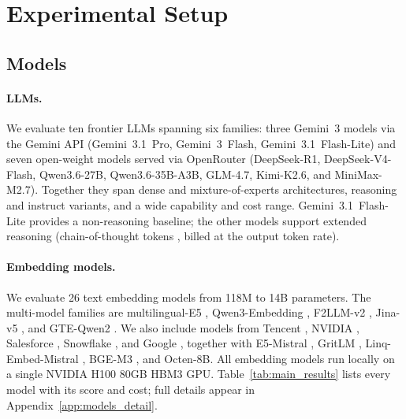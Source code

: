 \section{Experimental Setup}
\label{sec:setup}

\subsection{Models}

\paragraph{LLMs.}
We evaluate ten frontier LLMs spanning six families: three Gemini~3 models via the Gemini API (Gemini~3.1~Pro, Gemini~3~Flash, Gemini~3.1~Flash-Lite) and seven open-weight models served via OpenRouter (DeepSeek-R1, DeepSeek-V4-Flash, Qwen3.6-27B, Qwen3.6-35B-A3B, GLM-4.7, Kimi-K2.6, and MiniMax-M2.7).
Together they span dense and mixture-of-experts architectures, reasoning and instruct variants, and a wide capability and cost range.
Gemini~3.1~Flash-Lite provides a non-reasoning baseline; the other models support extended reasoning (chain-of-thought tokens \citep{wei2022cot}, billed at the output token rate).

\paragraph{Embedding models.}
We evaluate 26 text embedding models from 118M to 14B parameters. The multi-model families are multilingual-E5 \citep{wang2024textembeddingsweaklysupervisedcontrastive,wang2024improvingtextembeddingslarge}, Qwen3-Embedding \citep{qwen2025qwen3embedding}, F2LLM-v2 \citep{zhang2026f2llmv2}, Jina-v5 \citep{akram2026jinaembeddingsv5}, and GTE-Qwen2 \citep{li2023generaltextembeddingsmultistage}. We also include models from Tencent \citep{hu2025kalmv2}, NVIDIA \citep{babakhin2025llamaembednemotron}, Salesforce \citep{meng2024sfremb2}, Snowflake \citep{yu2024arctic}, and Google \citep{vera2025embeddinggemma}, together with E5-Mistral \citep{wang2024improvingtextembeddingslarge}, GritLM \citep{muennighoff2025generativerepresentationalinstructiontuning}, Linq-Embed-Mistral \citep{choi2024linq}, BGE-M3 \citep{chen2025m3embeddingmultilingualitymultifunctionalitymultigranularity}, and Octen-8B.
All embedding models run locally on a single NVIDIA H100 80GB HBM3 GPU.
Table~\ref{tab:main_results} lists every model with its score and cost; full details appear in Appendix~\ref{app:models_detail}.



